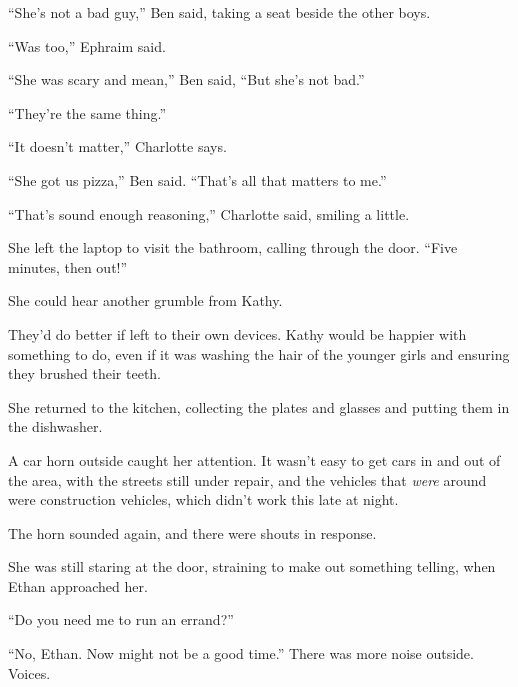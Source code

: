 ``She's not a bad guy,'' Ben said, taking a seat beside the other boys.



``Was too,'' Ephraim said.



``She was scary and mean,'' Ben said, ``But she's not bad.''



``They're the same thing.''



``It doesn't matter,'' Charlotte says.



``She got us pizza,'' Ben said.  ``That's all that matters to me.''



``That's sound enough reasoning,'' Charlotte said, smiling a little.



She left the laptop to visit the bathroom, calling through the door.  ``Five minutes, then out!''



She could hear another grumble from Kathy.



They'd do better if left to their own devices.  Kathy would be happier with something to do, even if it was washing the hair of the younger girls and ensuring they brushed their teeth.



She returned to the kitchen, collecting the plates and glasses and putting them in the dishwasher.



A car horn outside caught her attention.  It wasn't easy to get cars in and out of the area, with the streets still under repair, and the vehicles that \emph{were} around were construction vehicles, which didn't work this late at night.



The horn sounded again, and there were shouts in response.



She was still staring at the door, straining to make out something telling, when Ethan approached her.



``Do you need me to run an errand?''



``No, Ethan.  Now might not be a good time.''  There was more noise outside.  Voices.



